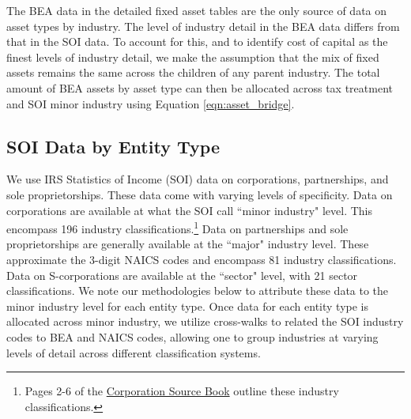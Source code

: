 \documentclass[article,11pt,letterpaper,fleqn]{article}
\theoremstyle{definition}
\numberwithin{equation}{section}
\begin{document}
The BEA data in the detailed fixed asset tables are the only source of data on asset types by industry.  The level of industry detail in the BEA data differs from that in the SOI data.  To account for this, and to identify cost of capital as the finest levels of industry detail, we make the assumption that the mix of fixed assets remains the same across the children of any parent industry.  The total amount of BEA assets by asset type can then be allocated across tax treatment and SOI minor industry using Equation \ref{eqn:asset_bridge}.


%
%
%

\subsection{SOI Data by Entity Type}

We use IRS Statistics of Income (SOI) data on corporations, partnerships, and sole proprietorships.  These data come with varying levels of specificity.  Data on corporations are available at what the SOI call ``minor industry" level.  This encompass 196 industry classifications.\footnote{Pages 2-6 of the \href{https://www.irs.gov/pub/irs-soi/13cosbsec1.pdf}{Corporation Source Book} outline these industry classifications.}  Data on partnerships and sole proprietorships are generally available at the ``major" industry level.  These approximate the 3-digit NAICS codes and encompass 81 industry classifications.  Data on S-corporations are available at the ``sector" level, with 21 sector classifications.  We note our methodologies below to attribute these data to the minor industry level for each entity type.  Once data for each entity type is allocated across minor industry, we utilize cross-walks to related the SOI industry codes to BEA and NAICS codes, allowing one to group industries at varying levels of detail across different classification systems.
\end{document}
